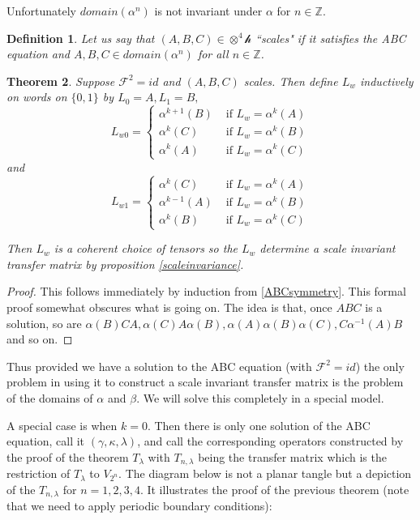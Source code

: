 \documentclass[11pt]{amsart}
\newtheorem{theorem}{Theorem}[section]
\newtheorem{definition}[theorem]{Definition}
\newcommand{\1}{\mathcal I}
\newcommand{\5}{\vskip 5pt}
\begin{document}
   Unfortunately $domain(\alpha^n)$ is not invariant under $\alpha$ for $n\in \mathbb Z$.

  \begin{definition} \label{scales} Let us say that $(A,B,C)\in \otimes^4 \mathcal h$  ``scales"  if it satisfies the ABC equation and
  $A, B, C \in domain(\alpha^n)$ for all $n\in \mathbb Z$.
  \end{definition}

\begin{theorem} \label{existence} Suppose $\mathscr F^2=id$ and  $(A,B,C)$ scales.
Then define $L_w$ inductively on words on $\{0,1\}$ by $L_0=A, L_1=B,$
$$ L_{w0}=\begin{cases} \alpha^{k+1}(B)&\mbox{ if } L_{w}=\alpha^k(A) \\
                                                         \alpha^k(C)&\mbox{ if } L_{w}=\alpha^k(B) \\
                                                         \alpha^k(A)&\mbox{ if } L_{w}=\alpha^k(C) 
\end{cases}$$ and
$$ L_{w1}=\begin{cases} \alpha^{k}(C)&\mbox{ if } L_{w}=\alpha^k(A) \\
                                                         \alpha^{k-1}(A)&\mbox{ if } L_{w}=\alpha^k(B) \\
                                                         \alpha^k(B)&\mbox{ if } L_{w}=\alpha^k(C) 
\end{cases}$$

Then $L_w$ is a coherent choice of tensors so the $L_w$ determine a scale invariant transfer matrix by proposition \ref{scaleinvariance}.
\end{theorem}
\begin{proof}This follows immediately by induction from \ref{ABCsymmetry}.
This formal proof somewhat obscures what is going on. The idea is that, once $ABC$ is a solution, so are
$\alpha(B)CA, \alpha(C)A\alpha(B),\alpha(A)\alpha(B)\alpha(C),C\alpha^{-1}(A)B$ and so on.
 
\end{proof}

Thus provided we have a solution to the ABC equation (with $\mathscr F^2=id$) the only problem in using it to construct
a scale invariant transfer matrix is the problem of the domains of $\alpha$ and $\beta$.  We will solve this completely in a special model.
 \iffalse

A special case is when $k=0$. Then there is only one solution of the ABC equation, call it $(\gamma,\kappa,\lambda)$, and call the
corresponding operators constructed by the proof of the theorem $T_\lambda$ with $T_{n,\lambda}$ being the transfer matrix which is
the restriction of $T_\lambda$ to $V_{2^n}$. The diagram below is not a planar tangle but a depiction of the $T_{n,\lambda}$ for 
$n=1,2,3,4$. It illustrates the proof of the previous theorem (note that we need to apply periodic boundary conditions):
\5 \5
\end{document}
